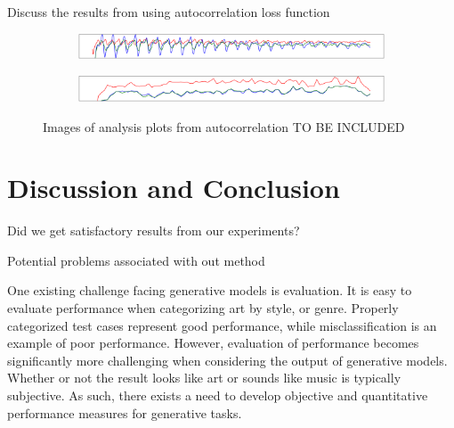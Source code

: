 \documentclass{article}
\begin{document}
Discuss the results from using autocorrelation loss function

\begin{figure}[h]
\begin{subfigure}{\textwidth}
  \centering
  \includegraphics[width = \textwidth]{row_ac_input}
  \caption{}
\end{subfigure}
\begin{subfigure}{\textwidth}
  \centering
  \includegraphics[width = \textwidth]{col_ac_input}
  \caption{}
\end{subfigure}
\caption{Images of analysis plots from autocorrelation TO BE INCLUDED}
\end{figure}

\section{Discussion and Conclusion}

Did we get satisfactory results from our experiments?

Potential problems associated with out method

One existing challenge facing generative models is evaluation. It is easy to evaluate performance when categorizing art by style, or genre. Properly categorized test cases represent good performance, while misclassification is an example of poor performance. However, evaluation of performance becomes significantly more challenging when considering the output of generative models. Whether or not the result looks like art or sounds like music is typically subjective. As such, there exists a need to develop objective and quantitative performance measures for generative tasks.


\end{document}
